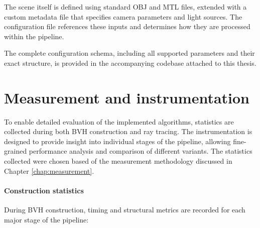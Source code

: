 The scene itself is defined using standard OBJ and MTL files, extended with a custom metadata file that specifies camera parameters and light sources. The configuration file references these inputs and determines how they are processed within the pipeline.

The complete configuration schema, including all supported parameters and their exact structure, is provided in the accompanying codebase attached to this thesis.

\section{Measurement and instrumentation}

To enable detailed evaluation of the implemented algorithms, statistics are collected during both BVH construction and ray tracing. The instrumentation is designed to provide insight into individual stages of the pipeline, allowing fine-grained performance analysis and comparison of different variants. The statistics collected were chosen based of the measurement methodology discussed in Chapter \ref{chap:measurement}.

\paragraph{Construction statistics} During BVH construction, timing and structural metrics are recorded for each major stage of the pipeline:

